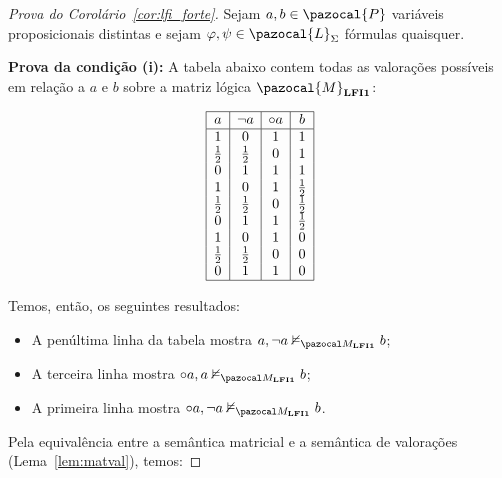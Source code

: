     \begin{proof}[Prova do Corolário~\ref{cor:lfi_forte}]
        Sejam $a, b \in \pazocal{P}$ variáveis proposicionais distintas e sejam $\phi, \psi \in \pazocal{L}_{\Sigma}$ fórmulas quaisquer.
        
        \noindent\textbf{Prova da condição (i):}
        A tabela abaixo contem todas as valorações possíveis em relação a $a$ e $b$ sobre a matriz lógica $\pazocal{M}_{\lfium{}}$:
        \begin{center}
            \[
                \begin{array}{|c|c|c|c|}%
                    \hline
                    a      & \neg a & \circ a & b   \\
                    \hline%
                    1           & 0        &  1  &    1\\
                    \meio{    } & \meio{}   &  0       &    1\\
                    0           & 1         &  1 &    1\\
                    1           & 0         &  1 &    \meio{}\\
                    \meio{    } & \meio{}   &  0       &    \meio{}\\
                    0           & 1         &  1 &    \meio{}\\
                    1           & 0         &  1 &    0\\
                   \meio{  }&  \meio{}  &   0       &    0\\
                    0           & 1      &     1 &    0\\
                    \hline
                \end{array}
            \]
        \end{center}
        
        Temos, então, os seguintes resultados:

        \begin{itemize}
            \item A penúltima linha da tabela mostra $a, \neg a \nconmat b$;
            \item A terceira linha mostra $\circ a, a \nconmat b$;
            \item A primeira linha mostra $\circ a, \neg a \nconmat b$.
        \end{itemize}
        
        Pela equivalência entre a semântica matricial e a semântica de valorações (Lema~\ref{lem:matval}), temos:


\end{proof}
